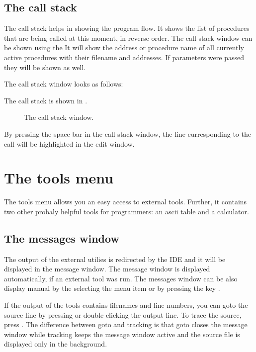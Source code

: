 \subsection{The call stack}
\label{se:callstack}
The call stack helps in showing the program flow. It shows the list of
procedures that are being called at this moment, in reverse order.
The call stack window can be shown using the 
It will show the address or procedure name of all currently active 
procedures with their filename and addresses. If parameters were passed
they will be shown as well.
\begin{htmlonly}

The call stack window looks as follows:
\end{htmlonly}
\begin{latexonly}
The call stack is shown in .
\begin{figure}[ht]
\caption{The call stack window.}\label{fig:callstack}
\ifpdf
{}
\else
{}
\fi
\end{figure}
\end{latexonly}

By pressing the space bar in the call stack window, the line curresponding
to the call will be highlighted in the edit window.

\section{The tools menu}
\label{se:toolsmenu}
The tools menu allows you an easy access to external tools. Further,
it contains two other probaly helpful tools for programmers: an
ascii table and a calculator.

\subsection{The messages window}
\label{se:toolsmessages}
The output of the external utilies is redirected by the IDE and it
will be displayed in the message window. The message window is
displayed automatically, if an external tool was run. The
messages window can be also display manual by the selecting the
menu item  or by pressing the key .

If the output of the tools contains filenames and line numbers,
you can goto the source line by pressing  or
double clicking the output line. To trace the source, press
. The difference between goto and tracking is that
goto closes the message window while tracking keeps the message
window active and the source file is displayed only in the background.

